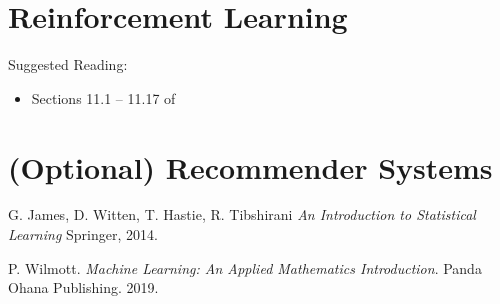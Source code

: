 \documentclass[11pt]{article}
\theoremstyle{plain}
\theoremstyle{definition}
\begin{document}
\newpage


\section{Reinforcement Learning}
Suggested Reading:
\begin{itemize}
\item Sections 11.1 -- 11.17 of \cite{wilmott}
\end{itemize}

\newpage
\section{(Optional) Recommender Systems}



\newpage

\begin{thebibliography}{9}
%


G. James, D. Witten, T. Hastie, R. Tibshirani {\it An Introduction to Statistical Learning} Springer, 2014.


P. Wilmott. {\it Machine Learning: An Applied Mathematics Introduction}. Panda Ohana Publishing. 2019.



\end{thebibliography}
\end{document}
